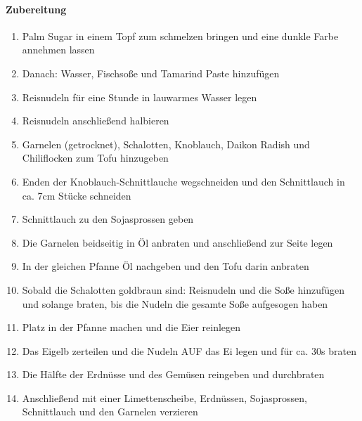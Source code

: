 \paragraph{Zubereitung}
\begin{enumerate}[noitemsep]
	\item Palm Sugar in einem Topf zum schmelzen bringen und eine dunkle Farbe annehmen lassen
	\item Danach: Wasser, Fischsoße und Tamarind Paste hinzufügen
	\item Reisnudeln für eine Stunde in lauwarmes Wasser legen 
	\item Reisnudeln anschließend halbieren
	\item Garnelen (getrocknet), Schalotten, Knoblauch, Daikon Radish und Chiliflocken zum Tofu hinzugeben
	\item Enden der Knoblauch-Schnittlauche wegschneiden und den Schnittlauch in ca. 7cm Stücke schneiden
	\item Schnittlauch zu den Sojasprossen geben 
	\item Die Garnelen beidseitig in Öl anbraten und anschließend zur Seite legen
	\item In der gleichen Pfanne Öl nachgeben und den Tofu darin anbraten
	\item Sobald die Schalotten goldbraun sind: Reisnudeln und die Soße hinzufügen und solange braten, bis die Nudeln die gesamte Soße aufgesogen haben 
	\item Platz in der Pfanne machen und die Eier reinlegen
	\item Das Eigelb zerteilen und die Nudeln AUF das Ei legen und für ca. 30s braten
	\item Die Hälfte der Erdnüsse und des Gemüsen reingeben und durchbraten
	\item Anschließend mit einer Limettenscheibe, Erdnüssen, Sojasprossen, Schnittlauch und den Garnelen verzieren
\end{enumerate}